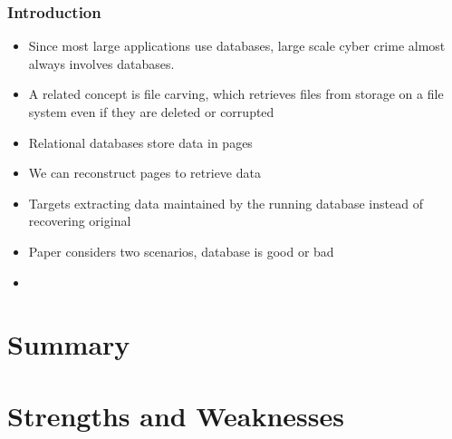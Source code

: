 \documentclass[11pt,]{article}
\begin{document}
\hypertarget{introduction}{%
\subsubsection{Introduction}\label{introduction}}

\begin{itemize}
\item
  Since most large applications use databases, large scale cyber crime
  almost always involves databases.
\item
  A related concept is file carving, which retrieves files from storage
  on a file system even if they are deleted or corrupted
\item
  Relational databases store data in pages
\item
  We can reconstruct pages to retrieve data
\item
  Targets extracting data maintained by the running database instead of
  recovering original
\item
  Paper considers two scenarios, database is good or bad
\item
\end{itemize}

\hypertarget{summary}{%
\section{Summary}\label{summary}}

\hypertarget{strengths-and-weaknesses}{%
\section{Strengths and Weaknesses}\label{strengths-and-weaknesses}}
\end{document}
